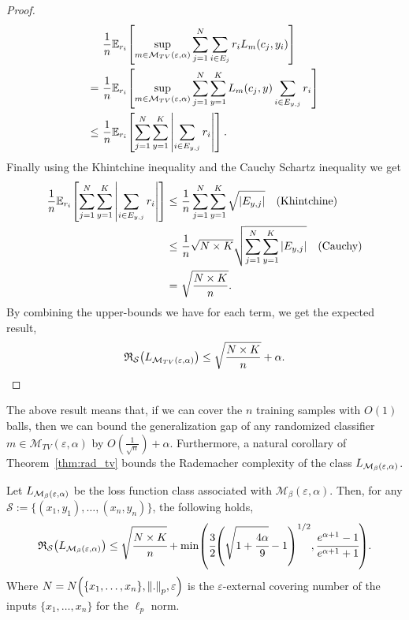 \begin{proof}
\begin{align*}
      &\frac1n \mathbb{E}_{r_i}\left[ \sup_{m  \in \mathcal{M}_{TV}\left(\varepsilon,\alpha\right)} \sum_{j=1}^N\sum_{i\in E_{j}} r_i \loss_{m }({c_j},y_i) \right] \\
      = ~& \frac1n \mathbb{E}_{r_i}\left[ \sup_{m  \in \mathcal{M}_{TV}\left(\varepsilon,\alpha\right)} \sum_{j=1}^N\sum_{y=1}^K  \loss_{m }({c_j},y) \sum_{i\in E_{y,j}}r_i \right]\\
      \leq ~&\frac1n \mathbb{E}_{r_i}\left[  \sum_{j=1}^N\sum_{y=1}^K  \abs{ \sum_{i\in E_{y,j}}r_i}\right] \equationspace.
 \end{align*}
 Finally using the Khintchine inequality and the Cauchy Schartz inequality we get 
 \begin{align*}
      \frac1n \mathbb{E}_{r_i}\left[  \sum_{j=1}^N\sum_{y=1}^K  \abs{ \sum_{i\in E_{y,j}}r_i}\right]\leq ~&\frac1n \sum_{j=1}^N\sum_{y=1}^K \sqrt{\abs{E_{y,j}}} \quad \text{(Khintchine)}\\
      \leq ~&\frac1n \sqrt{N\times K}\sqrt{\sum_{j=1}^N\sum_{y=1}^K \abs{E_{y,j}}} \quad \text{(Cauchy)} \\
      = ~&\sqrt{\frac{N\times K}{n}}.
 \end{align*}
By combining the upper-bounds we have for each term, we get the expected result,
 \begin{align*}
     \mathfrak{R}_{\mathcal{S}}\left(\loss_{\mathcal{M}_{TV}\left(\varepsilon,\alpha\right)}\right ) \leq \sqrt{\frac{N\times K}{n}}+\alpha.
 \end{align*}
\end{proof}

The above result means that, if we can cover the $n$ training samples with $O(1)$ balls, then we can bound the generalization gap of any randomized classifier $m  \in \mathcal{M}_{TV}\left(\varepsilon,\alpha\right)$ by $O\left(\frac{1}{\sqrt{n}}\right) + \alpha$. Furthermore, a natural corollary of Theorem~\ref{thm:rad_tv} bounds the Rademacher complexity of the class $\loss_{\mathcal{M}_{\beta}\left(\varepsilon,\alpha\right)}$. 



\begin{corollary}
\label{cor:rad_rob}
Let $\loss_{\mathcal{M}_{\beta}\left(\varepsilon,\alpha\right)}$ be the loss function class associated with $\mathcal{M}_{\beta}\left(\varepsilon,\alpha\right)$. Then, for any $\mathcal{S}:=\{({x_1},y_1), \dots  , ({x_n},y_n)\}$, the following holds,
\begin{equation*}
    \mathfrak{R}_{\mathcal{S}}\left(\loss_{\mathcal{M}_{\beta}\left(\varepsilon,\alpha\right)}\right ) \leq \sqrt{\cfrac{ N \times K }{n}}+ \min \left(\cfrac{3}{2}\left(\sqrt{1 + \cfrac{4\alpha}{9}} - 1\right)^{1/2}, \cfrac{e^{\alpha +1} -1}{e^{\alpha +1} +1}\right).
\end{equation*}
 Where $N =N\left( \{{x_1},\dots , {x_n}\}, \norm{.}_p, \varepsilon \right)$ is the $\varepsilon$-external covering number of the inputs $\{{x_1},\dots , {x_n}\}$ for the $\ell_p$ norm.
\end{corollary}

